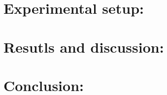 \documentclass[12pt,a4paper] {article}
\begin{document}
	\section{Experimental setup:}


	\section{Resutls and discussion:}


	\section{Conclusion:}
\end{document}
